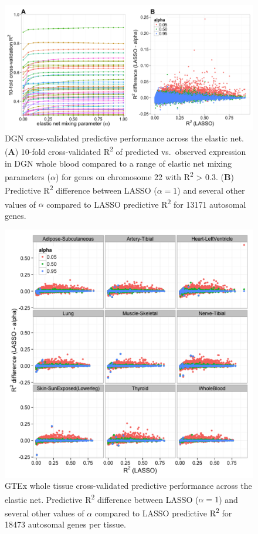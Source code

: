 \documentclass[]{article}
\begin{document}
\begin{figure}[htbp]
\centering
\includegraphics{GenArch_manuscript_files/figure-latex/EN-1.pdf}
\caption{DGN cross-validated predictive performance across the elastic
net. (\textbf{A}) 10-fold cross-validated R\textsuperscript{2} of
predicted vs.~observed expression in DGN whole blood compared to a range
of elastic net mixing parameters (\(\alpha\)) for genes on chromosome 22
with R\textsuperscript{2} \textgreater{} 0.3. (\textbf{B}) Predictive
R\textsuperscript{2} difference between LASSO (\(\alpha = 1\)) and
several other values of \(\alpha\) compared to LASSO predictive
R\textsuperscript{2} for 13171 autosomal genes.}
\end{figure}

\begin{figure}[htbp]
\centering
\includegraphics{GenArch_manuscript_files/figure-latex/ENtw-1.pdf}
\caption{GTEx whole tissue cross-validated predictive performance across
the elastic net. Predictive R\textsuperscript{2} difference between
LASSO (\(\alpha = 1\)) and several other values of \(\alpha\) compared
to LASSO predictive R\textsuperscript{2} for 18473 autosomal genes per
tissue.}
\end{figure}
\end{document}
